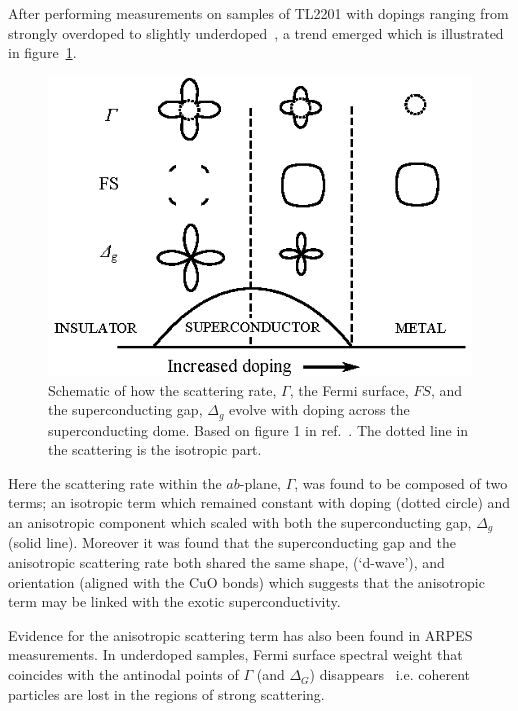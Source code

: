 After performing measurements on samples of \ac{TL2201} with dopings ranging from strongly overdoped to slightly underdoped~\cite{Abdel-Jawad2006}, a trend emerged which is illustrated in figure~\ref{Fig:Intro:AnisotropyPhase}. 
\begin{figure}[htbp]
    \begin{center}
        \includegraphics[scale=1.2]{Chapter-Introduction/Figures/AnisotropyPhase/AnisotropyPhase}
        \caption{Schematic of how the scattering rate, $\Gamma$, the Fermi surface, $FS$, and the superconducting gap, $\Delta_g$ evolve with doping across the superconducting dome. Based on figure 1 in ref.~\cite{Taillefer2006}. The dotted line in the scattering is the isotropic part.}
        \label{Fig:Intro:AnisotropyPhase}
    \end{center}
\end{figure}
Here the scattering rate within the $ab$-plane, $\Gamma$, was found to be composed of two terms; an isotropic term which remained constant with doping (dotted circle) and an anisotropic component which scaled with both the superconducting gap, $\Delta_g$ (solid line). Moreover it was found that the superconducting gap and the anisotropic scattering rate both shared the same shape, (`d-wave'), and orientation (aligned with the CuO bonds) which suggests that the anisotropic term may be linked with the exotic superconductivity. 

Evidence for the anisotropic scattering term has also been found in \ac{ARPES} measurements. In underdoped samples, Fermi surface spectral weight that coincides with the antinodal points of $\Gamma$ (and $\Delta_G$) disappears~\cite{Norman2010} i.e. coherent particles are lost in the regions of strong scattering.

